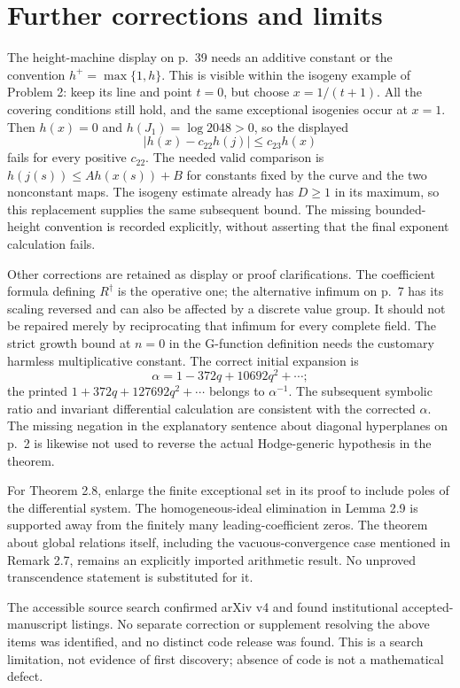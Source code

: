 \documentclass[10pt]{article}
\begin{document}
\section*{Further corrections and limits}
The height-machine display on p. 39 needs an additive constant or the convention \(h^+=\max\{1,h\}\). This is visible within the isogeny example of Problem 2: keep its line and point \(t=0\), but choose \(x=1/(t+1)\). All the covering conditions still hold, and the same exceptional isogenies occur at \(x=1\). Then \(h(x)=0\) and \(h(J_1)=\log 2048>0\), so the displayed \[|h(x)-c_{22}h(j)|\leq c_{23}h(x)\] fails for every positive \(c_{22}\). The needed valid comparison is \(h(j(s))\leq A h(x(s))+B\) for constants fixed by the curve and the two nonconstant maps. The isogeny estimate already has \(D\geq1\) in its maximum, so this replacement supplies the same subsequent bound. The missing bounded-height convention is recorded explicitly, without asserting that the final exponent calculation fails.\par
Other corrections are retained as display or proof clarifications. The coefficient formula defining \(R^\dagger\) is the operative one; the alternative infimum on p. 7 has its scaling reversed and can also be affected by a discrete value group. It should not be repaired merely by reciprocating that infimum for every complete field. The strict growth bound at \(n=0\) in the G-function definition needs the customary harmless multiplicative constant. The correct initial expansion is \[\alpha=1-372q+10692q^2+\cdots;\] the printed \(1+372q+127692q^2+\cdots\) belongs to \(\alpha^{-1}\). The subsequent symbolic ratio and invariant differential calculation are consistent with the corrected \(\alpha\). The missing negation in the explanatory sentence about diagonal hyperplanes on p. 2 is likewise not used to reverse the actual Hodge-generic hypothesis in the theorem.\par
For Theorem 2.8, enlarge the finite exceptional set in its proof to include poles of the differential system. The homogeneous-ideal elimination in Lemma 2.9 is supported away from the finitely many leading-coefficient zeros. The theorem about global relations itself, including the vacuous-convergence case mentioned in Remark 2.7, remains an explicitly imported arithmetic result. No unproved transcendence statement is substituted for it.\par
The accessible source search confirmed arXiv v4 and found institutional accepted-manuscript listings. No separate correction or supplement resolving the above items was identified, and no distinct code release was found. This is a search limitation, not evidence of first discovery; absence of code is not a mathematical defect.\par
\end{document}

